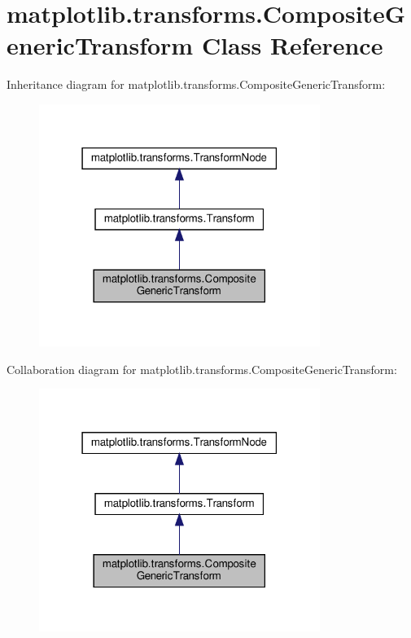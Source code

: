 \hypertarget{classmatplotlib_1_1transforms_1_1CompositeGenericTransform}{}\section{matplotlib.\+transforms.\+Composite\+Generic\+Transform Class Reference}
\label{classmatplotlib_1_1transforms_1_1CompositeGenericTransform}


Inheritance diagram for matplotlib.\+transforms.\+Composite\+Generic\+Transform\+:
\nopagebreak
\begin{figure}[H]
\begin{center}
\leavevmode
\includegraphics[width=259pt]{classmatplotlib_1_1transforms_1_1CompositeGenericTransform__inherit__graph}
\end{center}
\end{figure}


Collaboration diagram for matplotlib.\+transforms.\+Composite\+Generic\+Transform\+:
\nopagebreak
\begin{figure}[H]
\begin{center}
\leavevmode
\includegraphics[width=259pt]{classmatplotlib_1_1transforms_1_1CompositeGenericTransform__coll__graph}
\end{center}
\end{figure}
